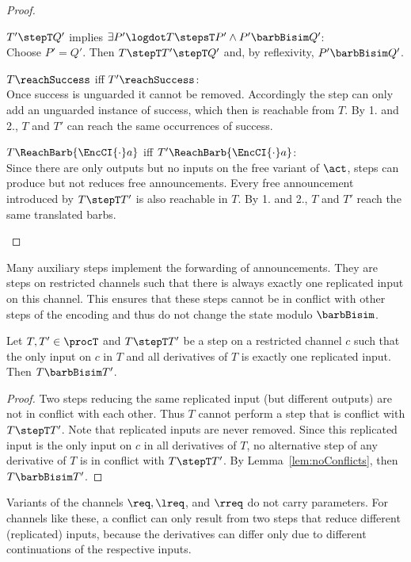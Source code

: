 \documentclass[]{eptcs}
\begin{document}
\begin{proof}
\begin{compactenum}
		\item $ T' \stepT Q' $ implies $ \exists P'\logdot T \stepsT P' \wedge P' \barbBisim Q' $:\\
			Choose $ P' = Q' $. Then $ T \stepT T' \stepT Q' $ and, by reflexivity, $ P' \barbBisim Q' $. 
		\item $ T\reachSuccess $ iff $ T'\reachSuccess $:\\
			Once success is unguarded it cannot be removed. Accordingly the step can only add an unguarded instance of success, which then is reachable from $ T $. By 1. and 2., $ T $ and $ T' $ can reach the same occurrences of success.
		\item $ T\ReachBarb{\EncCI{\cdot}a} $ iff $ T'\ReachBarb{\EncCI{\cdot}a} $:\\
			Since there are only outputs but no inputs on the free variant of $ \act $, steps can produce but not reduces free announcements. Every free announcement introduced by $ T \stepT T' $ is also reachable in $ T $. By 1. and 2., $ T $ and $ T' $ reach the same translated barbs.
	\end{compactenum}
\end{proof}

Many auxiliary steps implement the forwarding of announcements. They are steps on restricted channels such that there is always exactly one replicated input on this channel. This ensures that these steps cannot be in conflict with other steps of the encoding and thus do not change the state modulo $ \barbBisim $.

\begin{prop}
	Let $ T, T' \in \procT $ and $ T \stepT T' $ be a step on a restricted channel $ c $ such that the only input on $ c $ in $ T $ and all derivatives of $ T $ is exactly one replicated input.
	Then $ T \barbBisim T' $.
	\label{prop:auxStepsForward}
\end{prop}

\begin{proof}
	Two steps reducing the same replicated input (but different outputs) are not in conflict with each other. Thus $ T $ cannot perform a step that is conflict with $ T \stepT T' $. Note that replicated inputs are never removed. Since this replicated input is the only input on $ c $ in all derivatives of $ T $, no alternative step of any derivative of $ T $ is in conflict with $ T \stepT T' $. By Lemma~\ref{lem:noConflicts}, then $ T \barbBisim T' $.
\end{proof}

Variants of the channels $ \req, \lreq $, and $ \rreq $ do not carry parameters. For channels like these, a conflict can only result from two steps that reduce different (replicated) inputs, because the derivatives can differ only due to different continuations of the respective inputs.
\end{document}
